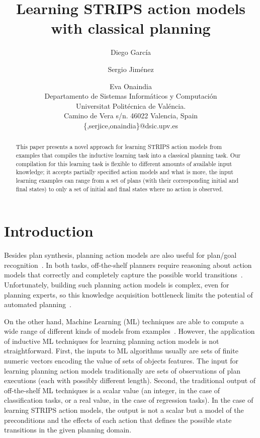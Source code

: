 \documentclass[letterpaper]{article} %
\begin{document}
\title{Learning STRIPS action models with classical planning}

\author{Diego Garc\'ia\and Sergio Jim\'enez\and Eva Onaindia\\
{\small Departamento de Sistemas Inform\'aticos y Computaci\'on}\\
{\small Universitat Polit\'ecnica de Val\'encia.}\\
{\small Camino de Vera s/n. 46022 Valencia, Spain}\\
{\small \{,serjice,onaindia\}@dsic.upv.es}}
 
\maketitle
\begin{abstract}
This paper presents a novel approach for learning STRIPS action models from examples that compiles the inductive learning task into a classical planning task. Our compilation for this learning task is flexible to different amounts of available input knowledge; it accepts partially specified action models and what is more, the input learning examples can range from a set of plans (with their corresponding initial and final states) to only a set of initial and final states where no action is observed.   
\end{abstract}


\section{Introduction}
Besides plan synthesis, planning action models are also useful for plan/goal recognition~\cite{ramirez2010probabilistic}. In both tasks, off-the-shelf planners require reasoning about action models that correctly and completely capture the possible world transitions~\cite{ghallab2004automated,geffner:book:2013}. Unfortunately, building such planning action models is complex, even for planning experts, so this knowledge acquisition bottleneck limits the potential of automated planning~\cite{kambhampati:modellite:AAAI2007}.  

On the other hand, Machine Learning (ML) techniques are able to compute a wide range of different kinds of models from examples~\cite{michalski2013machine}. However, the application of inductive ML techniques for learning planning action models is not straightforward. First, the inputs to ML algorithms usually are sets of finite numeric vectors encoding the value of sets of objects features. The input for learning planning action models traditionally are sets of observations of plan executions (each with possibly different length). Second, the traditional output of off-the-shelf ML techniques is a scalar value (an integer, in the case of classification tasks, or a real value, in the case of regression tasks). In the case of learning STRIPS action models, the output is not a scalar but a model of the preconditions and the effects of each action that defines the possible state transitions in the given planning domain. 
\end{document}
